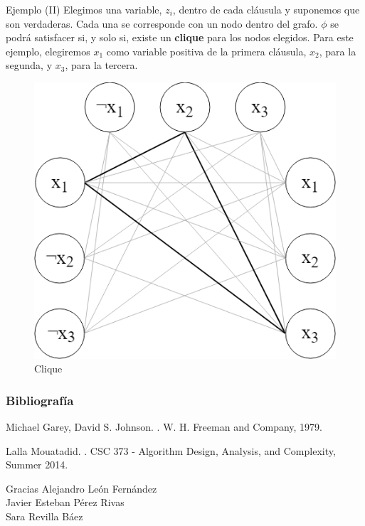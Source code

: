 \documentclass{beamer}
\begin{document}
\begin{frame}{Ejemplo (II)}
Elegimos una variable, $z_{i}$, dentro de cada cláusula y suponemos que son verdaderas. Cada una se corresponde con un nodo dentro del grafo. $\phi$ se podrá satisfacer si, y solo si, existe un \textbf{clique} para los nodos elegidos. Para este ejemplo, elegiremos $x_{1}$ como variable positiva de la primera cláusula,  $x_{2}$, para la segunda, y $x_{3}$, para la tercera.
\begin{figure}
\includegraphics[width=0.4\linewidth]{img/Grafo_Seleccion_Clique.png}
\caption{Clique}
\end{figure}
\end{frame}


\begin{frame}
\frametitle{Bibliografía}
\footnotesize{
    \begin{thebibliography}{99}
            Michael Garey, David S. Johnson.
        .
        \newblock W. H. Freeman and Company, 1979.
        
            Lalla Mouatadid.
        .
        \newblock CSC 373 - Algorithm Design, Analysis, and Complexity, Summer 2014.
    \end{thebibliography}
}
\end{frame}


\begin{frame}

\centering 
{\Huge{Gracias}}
\vfill
    Alejandro León Fernández \\
    Javier Esteban Pérez Rivas \\
    Sara Revilla Báez

\end{frame}

\end{document}
